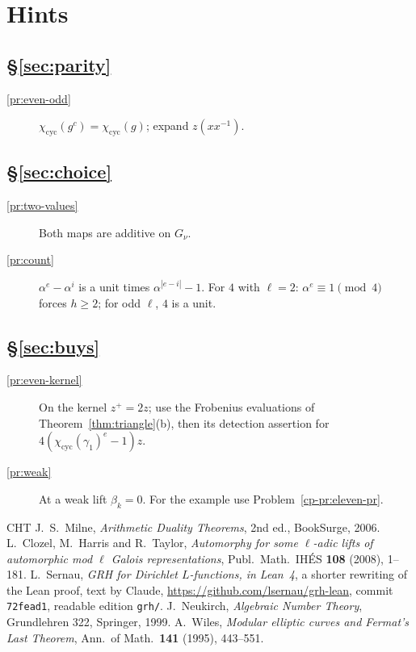 \documentclass[reqno]{amsart}
\theoremstyle{definition}
\theoremstyle{plain}
\newcommand{\cyc}{\chi_{\mathrm{cyc}}}
\begin{document}
\section*{Hints}

\subsection*{\S\ref{sec:parity}}
\begin{description}
\item[\ref{pr:even-odd}] \(\cyc(g^c) = \cyc(g)\); expand \(z(x x^{-1})\).
\end{description}

\subsection*{\S\ref{sec:choice}}
\begin{description}
\item[\ref{pr:two-values}] Both maps are additive on \(G_\nu\).
\item[\ref{pr:count}] \(\alpha^e - \alpha^i\) is a unit times \(\alpha^{|e-i|} - 1\).  For \(4\) with \(\ell = 2\): \(\alpha^e \equiv 1 \pmod 4\) forces \(h \ge 2\); for odd \(\ell\), \(4\) is a unit.
\end{description}

\subsection*{\S\ref{sec:buys}}
\begin{description}
\item[\ref{pr:even-kernel}] On the kernel \(z^+ = 2z\); use the Frobenius evaluations of Theorem~\ref{thm:triangle}(b), then its detection assertion for \(4(\cyc(\gamma_1)^e - 1)z\).
\item[\ref{pr:weak}] At a weak lift \(\beta_k = 0\).  For the example use Problem~\ref{cp-pr:eleven-pr}.
\end{description}

\begin{thebibliography}{CHT}
 J.~S.~Milne, \emph{Arithmetic Duality Theorems}, 2nd ed., BookSurge, 2006.
 L.~Clozel, M.~Harris and R.~Taylor, \emph{Automorphy for some \(\ell\)-adic lifts of automorphic mod \(\ell\) Galois representations}, Publ.\ Math.\ IH\'ES \textbf{108} (2008), 1--181.
 L.~Sernau, \emph{GRH for Dirichlet \(L\)-functions, in Lean~4}, a shorter rewriting of the Lean proof, text by Claude, \url{https://github.com/lsernau/grh-lean}, commit \texttt{72fead1}, readable edition \texttt{grh/}.
 J.~Neukirch, \emph{Algebraic Number Theory}, Grundlehren 322, Springer, 1999.
 A.~Wiles, \emph{Modular elliptic curves and Fermat's Last Theorem}, Ann.\ of Math.\ \textbf{141} (1995), 443--551.
\end{thebibliography}
\end{document}
